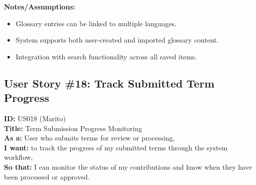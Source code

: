 \documentclass[12pt]{article}
\begin{document}
\vspace{1em}
\textbf{Notes/Assumptions:}
\begin{itemize}
    \item Glossary entries can be linked to multiple languages.
    \item System supports both user-created and imported glossary content.
    \item Integration with search functionality across all saved items.
\end{itemize}


\subsection{User Story \#18: Track Submitted Term Progress}
\textbf{ID:} US018 (Marito) \\
\textbf{Title:} Term Submission Progress Monitoring \\
\textbf{As a:} User who submits terms for review or processing, \\
\textbf{I want:} to track the progress of my submitted terms through the system workflow, \\
\textbf{So that:} I can monitor the status of my contributions and know when they have been processed or approved.
\end{document}
